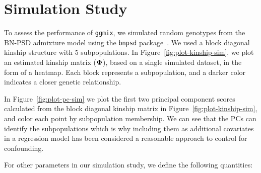 \section{Simulation Study}

To assess the performance of \texttt{ggmix}, we simulated random genotypes from the BN-PSD admixture model using the \texttt{bnpsd} package~\citep{bnpsd1,bnpsd2}. 
We used a block diagonal kinship structure with 5 subpopulations. 
In Figure~\ref{fig:plot-kinship-sim}, we plot an estimated kinship matrix  ($\boldsymbol{\Phi}$), based on a single simulated dataset, in the form of a heatmap. 
Each block represents a subpopulation, and a darker color indicates a closer genetic relationship. 



In Figure~\ref{fig:plot-pc-sim} we plot the first two principal component scores calculated from the block diagonal kinship matrix in Figure~\ref{fig:plot-kinship-sim}, and color each point by subpopulation membership. We can see that the PCs can identify the subpopulations which is why including them as additional covariates in a regression model has been considered a reasonable approach to control for confounding. 




For other parameters in our simulation study, we define the following quantities:


